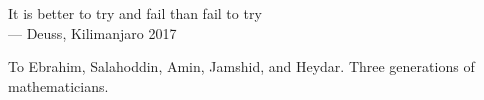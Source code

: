 \cleardoublepage
\thispagestyle{empty}


\vspace*{3cm}

\begin{raggedleft}
    	It is better to try and fail than fail to try\\
     --- Deuss, Kilimanjaro 2017\\
\end{raggedleft}

\vspace{4cm}

\begin{center}
    To Ebrahim, Salahoddin, Amin, Jamshid, and Heydar. Three generations of mathematicians.
\end{center}


